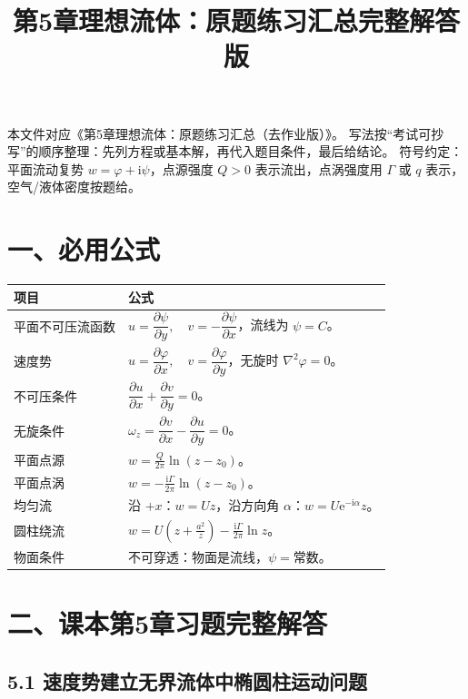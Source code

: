﻿\documentclass[UTF8,zihao=-4]{ctexart}
\title{\bfseries 第5章理想流体：原题练习汇总完整解答版}
\author{}
\date{}
\newcommand{\ii}{\mathrm i}
\newcommand{\e}{\mathrm e}
\begin{document}
\maketitle

本文件对应《第5章理想流体：原题练习汇总（去作业版）》。
写法按“考试可抄写”的顺序整理：先列方程或基本解，再代入题目条件，最后给结论。
符号约定：平面流动复势 \(w=\varphi+\ii\psi\)，点源强度 \(Q>0\) 表示流出，点涡强度用 \(\Gamma\) 或 \(q\) 表示，空气/液体密度按题给。

\section*{一、必用公式}

\begin{longtable}{p{3.2cm}p{11.5cm}}
\toprule
项目 & 公式 \\
\midrule
平面不可压流函数 & \(u=\dfrac{\partial \psi}{\partial y},\quad v=-\dfrac{\partial \psi}{\partial x}\)，流线为 \(\psi=C\)。\\
速度势 & \(u=\dfrac{\partial \varphi}{\partial x},\quad v=\dfrac{\partial \varphi}{\partial y}\)，无旋时 \(\nabla^2\varphi=0\)。\\
不可压条件 & \(\dfrac{\partial u}{\partial x}+\dfrac{\partial v}{\partial y}=0\)。\\
无旋条件 & \(\omega_z=\dfrac{\partial v}{\partial x}-\dfrac{\partial u}{\partial y}=0\)。\\
平面点源 & \(\displaystyle w=\frac{Q}{2\pi}\ln(z-z_0)\)。\\
平面点涡 & \(\displaystyle w=-\frac{\ii\Gamma}{2\pi}\ln(z-z_0)\)。\\
均匀流 & 沿 \(+x\)：\(w=Uz\)，沿方向角 \(\alpha\)：\(w=U\e^{-\ii\alpha}z\)。\\
圆柱绕流 & \(\displaystyle w=U\left(z+\frac{a^2}{z}\right)-\frac{\ii\Gamma}{2\pi}\ln z\)。\\
物面条件 & 不可穿透：物面是流线，\(\psi=\text{常数}\)。\\
\bottomrule
\end{longtable}

\section*{二、课本第5章习题完整解答}

\subsection*{5.1 速度势建立无界流体中椭圆柱运动问题}
\end{document}
